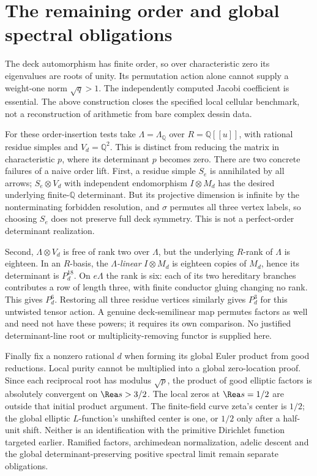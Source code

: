 \documentclass[11pt,oneside,openany]{book}
\theoremstyle{definition}\newtheorem{definition}[theorem]{Definition}
\theoremstyle{remark}\newtheorem{remark}[theorem]{Remark}
\begin{document}
\section{The remaining order and global spectral obligations}
The deck automorphism has finite order, so over characteristic zero its eigenvalues are roots of unity. Its permutation action alone cannot supply a weight-one norm $\sqrt q>1$. The independently computed Jacobi coefficient is essential. The above construction closes the specified local cellular benchmark, not a reconstruction of arithmetic from bare complex dessin data.

For these order-insertion tests take $\Lambda=\Lambda_{\mathbb{Q}}$ over $R=\mathbb{Q}[[u]]$, with rational residue simples and $V_d=\mathbb{Q}^2$. This is distinct from reducing the matrix in characteristic $p$, where its determinant $p$ becomes zero. There are two concrete failures of a naive order lift. First, a residue simple $S_e$ is annihilated by all arrows; $S_e\otimes V_d$ with independent endomorphism $I\otimes M_d$ has the desired underlying finite-$\mathbb{Q}$ determinant. But its projective dimension is infinite by the nonterminating forbidden resolution, and $\sigma$ permutes all three vertex labels, so choosing $S_e$ does not preserve full deck symmetry. This is not a perfect-order determinant realization.

Second, $\Lambda\otimes V_d$ is free of rank two over $\Lambda$, but the underlying $R$-rank of $\Lambda$ is eighteen. In an $R$-basis, the \emph{$\Lambda$-linear} $I\otimes M_d$ is eighteen copies of $M_d$, hence its determinant is $P_d^{18}$. On $e\Lambda$ the rank is six: each of its two hereditary branches contributes a row of length three, with finite conductor gluing changing no rank. This gives $P_d^6$. Restoring all three residue vertices similarly gives $P_d^3$ for this untwisted tensor action. A genuine deck-semilinear map permutes factors as well and need not have these powers; it requires its own comparison. No justified determinant-line root or multiplicity-removing functor is supplied here.

Finally fix a nonzero rational $d$ when forming its global Euler product from good reductions. Local purity cannot be multiplied into a global zero-location proof. Since each reciprocal root has modulus $\sqrt p$, the product of good elliptic factors is absolutely convergent on $\Rea s>3/2$. The local zeros at $\Rea s=1/2$ are outside that initial product argument. The finite-field curve zeta's center is $1/2$; the global elliptic $L$-function's unshifted center is one, or $1/2$ only after a half-unit shift. Neither is an identification with the primitive Dirichlet function targeted earlier. Ramified factors, archimedean normalization, adelic descent and the global determinant-preserving positive spectral limit remain separate obligations.
\end{document}
